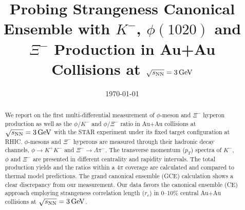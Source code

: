 \documentclass[%
 reprint,	
showpacs,
 amsmath,amssymb,
 aps,
 prc,
]{revtex4-1}
\begin{document}

\title{Probing Strangeness Canonical Ensemble with $K^{-}$, $\phi(1020)$ and $\Xi^{-}$ Production in Au+Au Collisions at ${\sqrt{s_{\rm NN}} = \rm{3\,GeV}}$}%


\noaffiliation

\date{\today}%

\begin{abstract}


We report on the first multi-differential measurement of $\phi$-meson and $\Xi^{-}$ hyperon production as well as the $\phi/K^-$ and $\phi/\Xi^-$ ratio in Au+Au collisions at ${\sqrt{s_{\rm NN}} = \rm{3\,GeV}}$ with the STAR experiment under its fixed target configuration at RHIC. $\phi$-mesons and $\Xi^{-}$ hyperons are measured through their hadronic decay channels, $\phi\rightarrow K^+K^-$ and $\Xi^-\rightarrow \Lambda\pi^-$. The transverse momentum ($p_T$) spectra of $K^-$, $\phi$ and $\Xi^{-}$ are presented in different centrality and rapidity intervals. The total production yields and the ratios within a $4\pi$ coverage are calculated and compared to thermal model predictions. The grand canonical ensemble (GCE) calculation shows a clear discrepancy from our measurement. Our data favors the canonical ensemble (CE) approach employing strangeness correlation length ($r_c$) in 0--10\% central Au+Au collisions at ${\sqrt{s_{\rm NN}} = \rm{3\,GeV}}$.


\end{abstract}
\end{document}
